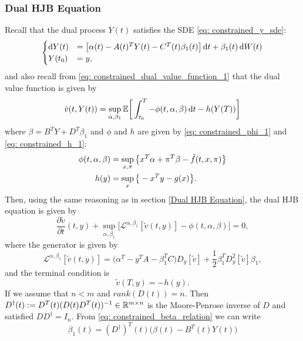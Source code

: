 \subsubsection{Dual HJB Equation}
Recall that the dual process $Y(t)$ satisfies the SDE \eqref{eq: constrained_y_sde}:
\begin{equation*}
    \begin{cases}
        \mathop{}\!\mathrm{d} Y(t) &= \big[ \alpha(t) - A(t)^T Y(t) - C^T(t) \beta_1(t)\big]\mathop{}\!\mathrm{d} t + \beta_1(t) \mathop{}\!\mathrm{d} W(t)\\
        Y(t_0) &= y,
    \end{cases}
\end{equation*}
and also recall from \eqref{eq: constrained_dual_value_function_1} that the dual value function is given by
\begin{equation*}
    \Tilde{v}(t, Y(t)) = \sup_{\alpha, \beta_1} \mathbb{E} \bigg[ \int_{t_0}^T - \phi(t, \alpha, \beta) \mathop{}\!\mathrm{d} t - h(Y(T)) \bigg]
\end{equation*}
where $\beta = B^T Y + D^T \beta_1$ and $\phi$ and $h$ are given by \eqref{eq: constrained_phi_1} and \eqref{eq: constrained_h_1}:
\begin{align*}
    \phi(t, \alpha, \beta)&= \sup_{x, \pi} \big\{x^T \alpha + \pi^T \beta - \tilde{f}\/(t, x, \pi) \big\}\\
    h(y) &= \sup_x \big\{-x^T y - g(x)\big\}. 
\end{align*}
Then, using the same reasoning as in section \ref{Dual HJB Equation}, the dual HJB equation is given by 
\begin{equation*}
    \frac{\partial \tilde{v}}{\partial t} (t, y) + \sup_{\alpha, \beta_1} \big[\mathcal{L}^{\alpha, \beta_1}[\tilde{v}(t,y)] - \phi(t, \alpha, \beta) \big] = 0,
\end{equation*}
where the generator is given by
\begin{equation*}
    \mathcal{L}^{\alpha, \beta_1}[\tilde{v}(t, y)] = \big(\alpha^T - y^T A -\beta_1^T C\big)D_y[\tilde{v}] + \frac12 \beta_1^T D_y^2[\tilde{v}] \beta_1,
\end{equation*}
and the terminal condition is
\begin{equation*}
    \tilde{v}(T,y) = - h(y).
\end{equation*}
If we assume that $n < m$ and $rank(D(t)) = n$. Then $D^\dagger(t) := D^T(t) (D(t) D^T(t))^{-1} \in \mathbb{R}^{m \times n}$ is the Moore-Penrose inverse of $D$ and satisfied $D D^\dagger = I_n$. From \eqref{eq: constrained_beta_relation} we can write 
\begin{equation*}
    \beta_1(t) = (D^\dagger)^T(t) \big(\beta(t) - B^T(t) Y(t)\big)
\end{equation*}
